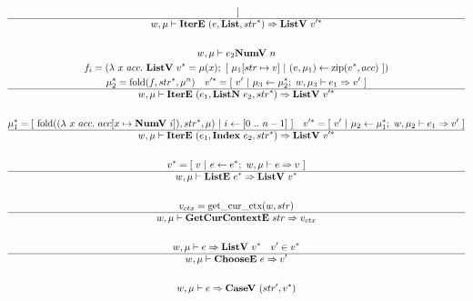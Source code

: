 \begin{gather*}
    ~ ] \\
  \hline
  w, \mu \vdash \itere ~ (e, \listiter, \seq{str}) \Rightarrow \listv ~ \seq{v'} \\
%
\newline \\
  w, \mu \vdash e_2 \numv ~ n \\
  f_i =
    (\lambda ~ x ~ acc. ~
      \listv ~ \seq v = \mu(x); ~
      [ ~ \mu_1[str \mapsto v] ~ | ~ (v, \mu_1) \leftarrow \zip (\seq v, acc) ~ ]
    )
  \\
  \seq{\mu_2} = \fold(f, \seq{str}, \mu^n) \quad
  \seq{v'} =
    [ ~
      v'
    ~ | ~
      \mu_3 \leftarrow \seq {\mu_2}; ~ w, \mu_3 \vdash e_1 \Rightarrow v'
    ~ ] \\
  \hline
  w, \mu \vdash \itere ~ (e_1, \listniter ~ e_2, \seq{str}) \Rightarrow \listv ~ \seq{v'} \\
%
\newline \\
  \seq{\mu_1} =
    [ ~
      \fold(
        (\lambda ~ x ~ acc. ~ acc[x \mapsto \numv ~ i]),
        \seq{str},
        \mu
      )
    ~ | ~
      i \leftarrow [0 ~ .. ~ n-1]
    ~ ]
  \quad
  \seq{v'} =
    [ ~
      v'
    ~ | ~
      \mu_2 \leftarrow \seq {\mu_1}; ~ w, \mu_2 \vdash e_1 \Rightarrow v'
    ~ ] \\
  \hline
  w, \mu \vdash \itere ~ (e_1, \listidxiter ~ e_2, \seq{str}) \Rightarrow \listv ~ \seq{v'} \\
%
\newline \\
  \seq{v} = [ ~ v ~ | ~ e \leftarrow \seq{e}; ~ w, \mu \vdash e \Rightarrow v ~ ] \\
  \hline
  w, \mu \vdash \liste ~ \seq{e} \Rightarrow \listv ~ \seq{v} \\
%
\newline \\
  v_{ctx} = \getcurctx(w, str) \\
  \hline
  w, \mu \vdash \getcurctxe ~ str \Rightarrow v_{ctx} \\
%
\newline \\
  w, \mu \vdash e \Rightarrow \listv ~ \seq{v} \quad
  v' \in \seq{v} \\
  \hline
  w, \mu \vdash \choosee ~ e \Rightarrow v' \\
%
\newline \\
  w, \mu \vdash e \Rightarrow \casev ~ (str', \seq{v}) \\

\end{gather*}

